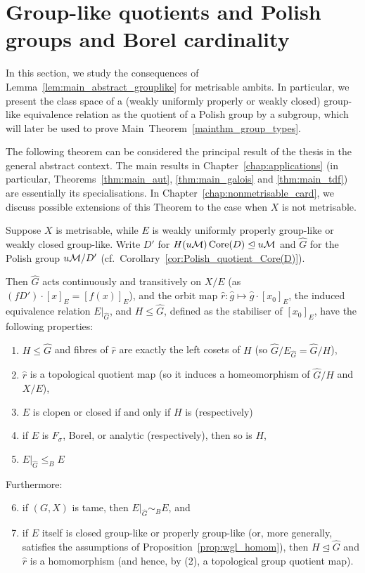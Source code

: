 	
	\section[Group-like quotients and Polish groups and Borel cardinality]{Group-like quotients and Polish groups and Borel cardinality}
	In this section, we study the consequences of Lemma~\ref{lem:main_abstract_grouplike} for metrisable ambits. In particular, we present the class space of a (weakly uniformly properly or weakly closed) group-like equivalence relation as the quotient of a Polish group by a subgroup, which will later be used to prove Main~Theorem~\ref{mainthm_group_types}.
	
	The following theorem can be considered the principal result of the thesis in the general abstract context. The main results in Chapter~\ref{chap:applications} (in particular, Theorems~\ref{thm:main_aut}, \ref{thm:main_galois} and \ref{thm:main_tdf}) are essentially its specialisations. In Chapter~\ref{chap:nonmetrisable_card}, we discuss possible extensions of this Theorem to the case when $X$ is not metrisable.
	\begin{thm}
		\label{thm:main_abstract}
		Suppose $X$ is metrisable, while $E$ is weakly uniformly properly group-like or weakly closed group-like. Write $D'$ for $H(u{\mathcal M})\operatorname{{Core}}(D)\trianglelefteq u{\mathcal M}$ and $\hat G$ for the Polish group $u{\mathcal M}/D'$ (cf.\ Corollary~\ref{cor:Polish_quotient_Core(D)}).
		
		Then $\hat G$ acts continuously and transitively on $X/E$ (as $(fD')\cdot [x]_E=[f(x)]_E$), and the orbit map $\hat r\colon \hat g\mapsto \hat g\cdot [x_0]_E$, the induced equivalence relation $E|_{\hat G}$, and $H\leq \hat G$, defined as the stabiliser of $[x_0]_E$, have the following properties:
		\begin{enumerate}
			\item
			$H\leq \hat G$ and fibres of $\hat r$ are exactly the left cosets of $H$ (so $\hat G/E_{\hat G}=\hat G/H$),
			\item
			$\hat r$ is a topological quotient map (so it induces a homeomorphism of $\hat G/H$ and $X/E$),
			\item
			$E$ is clopen or closed if and only if $H$ is (respectively)
			\item
			if $E$ is $F_\sigma$, Borel, or analytic (respectively), then so is $H$,
			\item
			$E|_{\hat G}\leq_B E$
		\end{enumerate}
		
		Furthermore:
		\begin{enumerate}
			\setcounter{enumi}{5}
			\item
			if $(G,X)$ is tame, then $E|_{\hat G}\sim_B E$, and
			\item
			if $E$ itself is closed group-like or properly group-like (or, more generally, satisfies the assumptions of Proposition~\ref{prop:wgl_homom}), then $H\unlhd \hat G$ and $\hat r$ is a homomorphism (and hence, by (2), a topological group quotient map).
		\end{enumerate}
	\end{thm}
